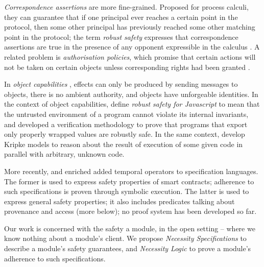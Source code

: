 \emph{Correspondence assertions} are more fine-grained. Proposed for 
process calculi, they can guarantee  that if one principal ever reaches a certain point in the protocol, then some other principal has previously reached some other matching point in the protocol; 
the term \emph{robust safety}  expresses that correspondence assertions are true in the presence of any opponent expressible in the calculus \cite{correspondence}. 
A related problem is \emph{authorisation policies}, which promise that 
certain actions will not be taken on certain objects
unless corresponding  rights had been granted  \cite{auhtorInDistr}.

In   \emph{object capabilities} \cite{MillerPhD},
effects can only be produced by sending messages to objects,  there
is no ambient authority, and  objects 
have unforgeable identities.
In the context of object capabilities, \citeauthor{ddd} define  \emph{robust safety for Javascript}  
to mean that the untrusted environment of a program cannot violate 
its internal invariants, and developed  a verification methodology   to 
prove   that programs that  export only properly wrapped values  are robustly safe.
In the same context, \citeauthor{dd} develop Kripke models to reason about 
the result of execution of some given code in parallel
with arbitrary, unknown code.  
 
 More recently,  \citeauthor{VerX} and  \citeauthor{FASE}
 enriched added temporal operators to specification languages.
  The former is used to express safety properties of smart contracts;
 adherence to such specifications is proven through symbolic 
 execution. The latter is used to express general safety properties; it
 also includes predicates talking about provenance
 and access (more below); no proof system has been developed so far.
 
\vspace{.03in}
Our work is concerned with the safety a module, in the open setting -- where we know nothing about a
module's client.
We propose \emph{Necessity Specifications} to describe a module's safety guarantees,
and \emph{Necessity Logic} to prove a module's adherence to such specifications.
%


